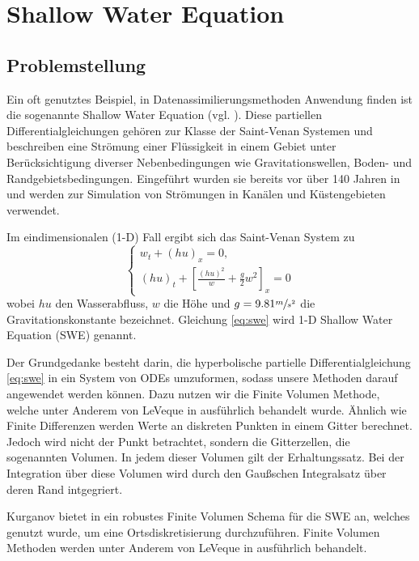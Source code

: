 \section{Shallow Water Equation}
\subsection{Problemstellung}
Ein oft genutztes Beispiel, in Datenassimilierungsmethoden Anwendung finden ist die sogenannte Shallow Water Equation (vgl. \cite{zou,navon}). 
Diese partiellen Differentialgleichungen gehören zur Klasse der Saint-Venan Systemen und beschreiben eine Strömung einer Flüssigkeit in einem Gebiet unter Berücksichtigung diverser Nebenbedingungen wie Gravitationswellen, Boden- und Randgebietsbedingungen. Eingeführt wurden sie bereits vor über 140 Jahren in \cite{saint1871theorie} und werden zur Simulation von Strömungen in Kanälen und Küstengebieten verwendet.

Im eindimensionalen (1-D) Fall ergibt sich das Saint-Venan System zu 
\begin{equation}
\begin{cases}
 w_t + (hu)_x = 0,\\
 (hu)_t + \left[\frac{(hu)^2}{w} + \frac{g}{2}w^2\right]_x = 0
\end{cases} 
\label{eq:swe}
\end{equation}
wobei $hu$ den Wasserabfluss, $w$ die Höhe und $g=9.81 \sfrac{m}{s^2}$ die Gravitationskonstante bezeichnet.
Gleichung \eqref{eq:swe} wird 1-D Shallow Water Equation (SWE) genannt.

Der Grundgedanke besteht darin, die hyperbolische partielle Differentialgleichung \eqref{eq:swe} in ein System von ODEs umzuformen, sodass unsere Methoden darauf angewendet werden können.
Dazu nutzen wir die Finite Volumen Methode, welche unter Anderem von LeVeque in \cite{leveque2002finite} ausführlich behandelt wurde. Ähnlich wie Finite Differenzen werden Werte an diskreten Punkten in einem Gitter berechnet. Jedoch wird nicht der Punkt betrachtet, sondern die Gitterzellen, die sogenannten Volumen. In jedem dieser Volumen gilt der Erhaltungssatz. Bei der Integration über diese Volumen wird durch den Gaußschen Integralsatz über deren Rand intgegriert. 

Kurganov bietet in \cite{kurganov2007second} ein robustes Finite Volumen Schema für die SWE an, welches genutzt wurde, um eine Ortsdiskretisierung durchzuführen. Finite Volumen Methoden werden unter Anderem von LeVeque in \cite{leveque2002finite} ausführlich behandelt.


